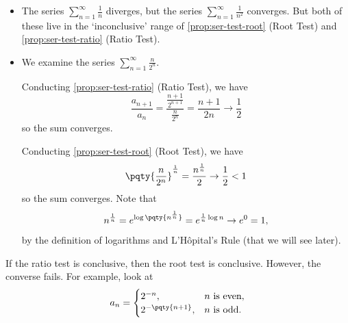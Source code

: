 \begin{examples}
    \label{ex:ser-test-root-ratio}%
    \begin{itemize}
        \item The series \(\sum_{n = 1}^{\infty} \frac{1}{n}\) diverges, but the series \(\sum_{n = 1}^{\infty} \frac{1}{n^2}\) converges. But both of these live in the `inconclusive' range of \autoref{prop:ser-test-root} (Root Test) and \autoref{prop:ser-test-ratio} (Ratio Test).
        \item We examine the series \(\sum_{n = 1}^{\infty} \frac{n}{2^n}\).
        
        Conducting \autoref{prop:ser-test-ratio} (Ratio Test), we have
        \[
            \frac{a_{n + 1}}{a_n} = \frac{\frac{n + 1}{2^{n + 1}}}{\frac{n}{2^n}} = \frac{n + 1}{2n} \to \frac{1}{2}
        \]
        so the sum converges.

        Conducting \autoref{prop:ser-test-root} (Root Test), we have
        \[
            \pqty{\frac{n}{2^n}}^{\frac{1}{n}} = \frac{n^{\frac{1}{n}}}{2} \to \frac{1}{2} < 1
        \]
        so the sum converges. Note that
        \[
            n^{\frac{1}{n}} = e^{\log\pqty{n^{\frac{1}{n}}}} = e^{\frac{1}{n} \log n} \to e^0 = 1,
        \]
        by the definition of logarithms and L'H\^{o}pital's Rule (that we will see later).
    \end{itemize}
\end{examples}

\begin{remark}
    If the ratio test is conclusive, then the root test is conclusive. However, the converse fails. For example, look at
    \[
        a_n = \begin{cases}
            2^{-n}, & n\text{ is even}, \\
            2^{-\pqty{n + 1}}, & n\text{ is odd}.
        \end{cases}
    \]
\end{remark}

